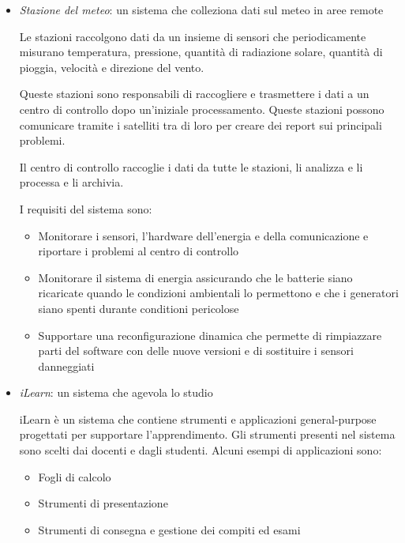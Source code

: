 \documentclass[a4paper]{article}
\begin{document}
\begin{itemize}
  \item \textit{Stazione del meteo}: un sistema che colleziona dati sul meteo in aree remote

    \vspace{1em}
    \noindent
    Le stazioni raccolgono dati da un insieme di sensori che periodicamente misurano 
    temperatura, pressione, quantità di radiazione solare, quantità di pioggia, velocità 
    e direzione del vento.

    Queste stazioni sono responsabili di raccogliere e trasmettere i dati a un centro di
    controllo dopo un'iniziale processamento. Queste stazioni possono comunicare tramite
    i satelliti tra di loro per creare dei report sui principali problemi.

    Il centro di controllo raccoglie i dati da tutte le stazioni, li analizza e li processa
    e li archivia.

    I requisiti del sistema sono:
    \begin{itemize}
      \item Monitorare i sensori, l'hardware dell'energia e della comunicazione e riportare
        i problemi al centro di controllo

      \item Monitorare il sistema di energia assicurando che le batterie siano ricaricate
        quando le condizioni ambientali lo permettono e che i generatori siano spenti
        durante conditioni pericolose

      \item Supportare una reconfigurazione dinamica che permette di rimpiazzare parti del
        software con delle nuove versioni e di sostituire i sensori danneggiati
    \end{itemize}

  \item \textit{iLearn}: un sistema che agevola lo studio

    \vspace{1em}
    \noindent
    iLearn è un sistema che contiene strumenti e applicazioni general-purpose progettati
    per supportare l'apprendimento. Gli strumenti presenti nel sistema sono scelti dai
    docenti e dagli studenti. Alcuni esempi di applicazioni sono:
    \begin{itemize}
      \item Fogli di calcolo
      \item Strumenti di presentazione
      \item Strumenti di consegna e gestione dei compiti ed esami
    \end{itemize}


\end{itemize}
\end{document}
